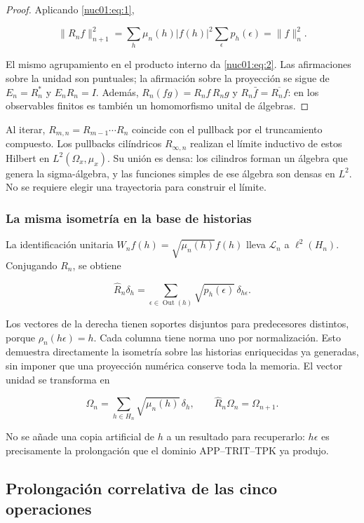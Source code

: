 \begin{proof}
Aplicando \eqref{nuc01:eq:1},

\[
\|R_nf\|_{n+1}^2
=\sum_h\mu_n(h)|f(h)|^2\sum_\epsilon p_h(\epsilon)
=\|f\|_n^2.
\]

El mismo agrupamiento en el producto interno da \eqref{nuc01:eq:2}. Las afirmaciones sobre la unidad son puntuales; la afirmación sobre la proyección se sigue de \(E_n=R_n^*\) y \(E_nR_n=I\). Además, \(R_n(fg)=R_nf\,R_ng\) y \(R_n\bar f=\overline{R_nf}\): en los observables finitos es también un homomorfismo unital de álgebras.
\end{proof}

Al iterar, \(R_{m,n}=R_{m-1}\cdots R_n\) coincide con el pullback por el truncamiento compuesto. Los pullbacks cilíndricos \(R_{\infty,n}\) realizan el límite inductivo de estos Hilbert en \(L^2(\Omega_x,\mu_x)\). Su unión es densa: los cilindros forman un álgebra que genera la sigma-álgebra, y las funciones simples de ese álgebra son densas en \(L^2\). No se requiere elegir una trayectoria para construir el límite.

\subsubsection{La misma isometría en la base de historias}

La identificación unitaria \(W_nf(h)=\sqrt{\mu_n(h)}f(h)\) lleva \(\mathscr L_n\) a \(\ell^2(H_n)\). Conjugando \(R_n\), se obtiene

\begin{equation}
\widehat R_n\delta_h
=\sum_{\epsilon\in\operatorname{Out}(h)}\sqrt{p_h(\epsilon)}\,\delta_{h\epsilon}.
\label{nuc01:eq:3}
\end{equation}

Los vectores de la derecha tienen soportes disjuntos para predecesores distintos, porque \(\rho_n(h\epsilon)=h\). Cada columna tiene norma uno por normalización. Esto demuestra directamente la isometría sobre las historias enriquecidas ya generadas, sin imponer que una proyección numérica conserve toda la memoria. El vector unidad se transforma en

\[
\Omega_n=\sum_{h\in H_n}\sqrt{\mu_n(h)}\,\delta_h,
\qquad \widehat R_n\Omega_n=\Omega_{n+1}.
\]

No se añade una copia artificial de \(h\) a un resultado para recuperarlo: \(h\epsilon\) es precisamente la prolongación que el dominio APP–TRIT–TPK ya produjo.

\subsection{Prolongación correlativa de las cinco operaciones}

